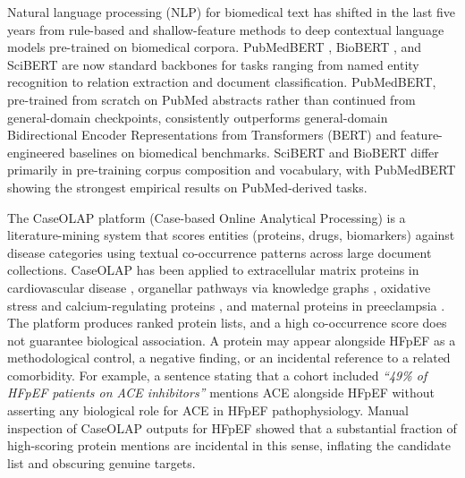 \documentclass[sn-basic,pdflatex]{sn-jnl}
\begin{document}
Natural language processing (NLP) for biomedical text has shifted in the last five years from rule-based and shallow-feature methods to deep contextual language models pre-trained on biomedical corpora. PubMedBERT \citep{gu2021pubmedbert}, BioBERT \citep{lee2020biobert}, and SciBERT \citep{beltagy2019scibert} are now standard backbones for tasks ranging from named entity recognition to relation extraction and document classification. PubMedBERT, pre-trained from scratch on PubMed abstracts rather than continued from general-domain checkpoints, consistently outperforms general-domain Bidirectional Encoder Representations from Transformers (BERT) \citep{devlin2019bert} and feature-engineered baselines on biomedical benchmarks. SciBERT and BioBERT differ primarily in pre-training corpus composition and vocabulary, with PubMedBERT showing the strongest empirical results on PubMed-derived tasks.

The CaseOLAP platform (Case-based Online Analytical Processing) \citep{liem2018ecm,liem2019cloud,fang2021caseolap,fang2023organellar,liem2023caseolap} is a literature-mining system that scores entities (proteins, drugs, biomarkers) against disease categories using textual co-occurrence patterns across large document collections. CaseOLAP has been applied to extracellular matrix proteins in cardiovascular disease \citep{liem2018ecm}, organellar pathways via knowledge graphs \citep{fang2023organellar}, oxidative stress and calcium-regulating proteins \citep{bhatt2024oxidative}, and maternal proteins in preeclampsia \citep{urdang2025preeclampsia}. The platform produces ranked protein lists, and a high co-occurrence score does not guarantee biological association. A protein may appear alongside HFpEF as a methodological control, a negative finding, or an incidental reference to a related comorbidity. For example, a sentence stating that a cohort included \emph{``49\% of HFpEF patients on ACE inhibitors''} mentions ACE alongside HFpEF without asserting any biological role for ACE in HFpEF pathophysiology. Manual inspection of CaseOLAP outputs for HFpEF showed that a substantial fraction of high-scoring protein mentions are incidental in this sense, inflating the candidate list and obscuring genuine targets.
\end{document}
